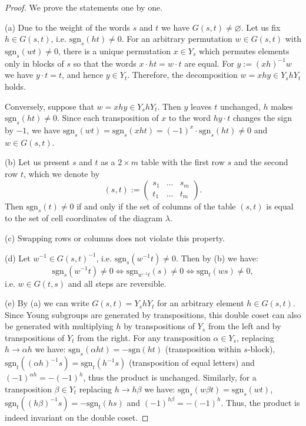 \documentclass[12pt, reqno]{amsart}
\theoremstyle{definition}
\newcommand{\sgn}{\mathrm{sgn}}
\begin{document}
\begin{proof}
    We prove the statements one by one.
    
    (a) Due to the weight of the words $s$ and $t$ we have $G(s,t) \neq \varnothing$. Let us fix $h \in G(s,t)$, i.e. $\sgn_s(ht) \neq 0$.
	For an arbitrary permutation $w \in G(s,t)$ with $\sgn_{s}(w t) \neq 0$, there is a unique permutation $x \in Y_{s}$ which permutes elements only in blocks of $s$ so that the words $x\cdot h t = w \cdot t$ are equal. For $y := (xh)^{-1} w$ we have $y \cdot t = t$, and hence $y \in Y_t$. Therefore, the decomposition $w = xhy \in Y_s h Y_t$ holds. 
	
	Conversely, suppose that $w = xhy \in Y_s h Y_t$. Then $y$ leaves $t$ unchanged, $h$ makes $\sgn_s(ht) \neq 0$. Since each transposition of $x$ to the word $hy \cdot t$ changes the sign by $-1$, we have $\sgn_s(wt) = \sgn_s(xht) = (-1)^{x} \cdot \sgn_s(ht) \neq 0$ and $w \in G(s,t)$.
	
	\vspace{0.5em}

    (b) Let us present $s$ and $t$ as a $2 \times m$ table with the first row $s$ and the second row $t$, which we denote by 
    $$(s,t) := \begin{pmatrix}
        s_1 & \ldots & s_m\\
        t_1 & \ldots & t_m
    \end{pmatrix}.
    $$ 
    Then $\sgn_s(t) \neq 0$ if and only if the set of columns of the table $(s,t)$ is equal to the set of cell coordinates of the diagram $\lambda$. 
    
    \vspace{0.5em}

    (c) Swapping rows or columns does not violate this property. 
    
    \vspace{0.5em}

    (d) Let $w^{-1} \in G(s,t)^{-1}$, i.e. $\sgn_s(w^{-1} t) \neq 0$. Then by (b) we have:
    $$
        \sgn_s(w^{-1}t) \neq 0 \iff \sgn_{w^{-1}t}(s) \neq 0 \iff \sgn_{t}(ws) \neq 0,
    $$
    i.e. $w \in G(t,s)$ and all steps are reversible.
    
    \vspace{0.5em}

    (e) By (a) we can write $G(s,t) = Y_s h Y_t$ for an arbitrary element $h \in G(s,t)$. Since Young subgroups are generated by transpositions, this double coset can also be generated with multiplying $h$ by transpositions of $Y_s$ from the left and by transpositions of $Y_t$ from the right. 
    For any transposition $\alpha \in Y_s$, replacing $h \to \alpha h$ we have: $\sgn_s(\alpha h t) = -\sgn(h t)$ (transposition within $s$-block), $\sgn_t((\alpha h)^{-1}s) = \sgn_t(h^{-1} s)$ (transposition of equal letters) and $(-1)^{\alpha h} = -(-1)^{h}$, thus the product is unchanged. 
    Similarly, for a transposition $\beta \in Y_t$ replacing $h \to h \beta$ we have: $\sgn_s(w\beta t) = \sgn_s(wt)$, $\sgn_t((h\beta)^{-1} s) = -\sgn_t(hs)$ and $(-1)^{h\beta} = -(-1)^{h}$. Thus, the product is indeed invariant on the double coset.
    

\end{proof}
\end{document}
